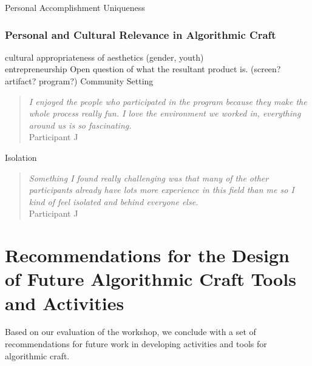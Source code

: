 \documentclass{sigchi}
\begin{document}
Personal Accomplishment
Uniqueness

\subsubsection{Personal and Cultural Relevance in Algorithmic Craft}

cultural appropriateness of aesthetics (gender, youth)\\

entrepreneurship
Open question of what the resultant product is. (screen? artifact? program?)
Community Setting\\
 \begin{quotation}
\textit{I enjoyed the people who participated in the program because they make the whole process really fun. I love the environment we worked in, everything around us is so fascinating.}
\\Participant J
\end{quotation}

Isolation\\
 \begin{quotation}
\textit{Something I found really challenging was that many of the other participants already have lots more experience in this field than me so I kind of feel isolated and behind everyone else.}
\\Participant J
\end{quotation}


\section{Recommendations for the Design of Future Algorithmic Craft Tools and Activities}
Based on our evaluation of the workshop, we conclude with a set of recommendations for future work in developing activities and tools for algorithmic craft. 
\end{document}
